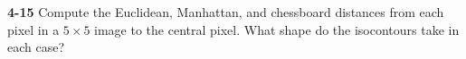 \documentclass[a4paper]{article}
\begin{document}
\begin{spacing}{2.0}
	\noindent
	\textbf{4-15} Compute the Euclidean, Manhattan, and chessboard distances from each pixel in a $5\times 5$ image to the central pixel. What shape do the isocontours take in each case?\\

\end{spacing}
\end{document}
